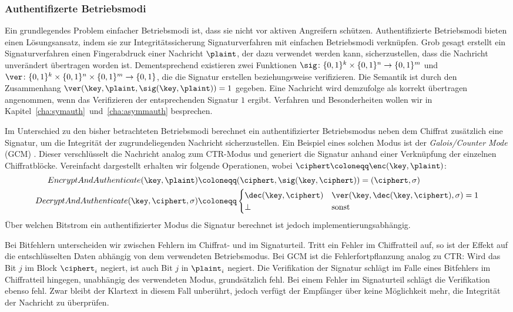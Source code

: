 \subsubsection{Authentifizerte Betriebsmodi}
Ein grundlegendes Problem einfacher Betriebsmodi ist, dass sie nicht vor aktiven Angreifern schützen. Authentifizierte Betriebsmodi bieten einen Lösungsansatz, indem sie zur Integritätssicherung Signaturverfahren mit einfachen Betriebsmodi verknüpfen. Grob gesagt erstellt ein Signaturverfahren einen Fingerabdruck einer Nachricht $\plaint$, der dazu verwendet werden kann, sicherzustellen, dass die Nachricht unverändert übertragen worden ist. Dementsprechend existieren zwei Funktionen $\sig \colon \{0,1\}^k \times \{0,1\}^n \rightarrow \{0,1\}^m$ und $\ver \colon \{0,1\}^k \times \{0,1\}^n \times \{0,1\}^m \rightarrow \{0,1\}$, die die Signatur erstellen beziehungsweise verifizieren. Die Semantik ist durch den Zusammenhang $\ver(\key,\plaint,\sig(\key, \plaint)) = 1$ gegeben. Eine Nachricht wird demzufolge als korrekt übertragen angenommen, wenn das Verifizieren der entsprechenden Signatur $1$ ergibt.
Verfahren und Besonderheiten wollen wir in Kapitel~\ref{cha:symauth}~und~\ref{cha:asymmauth} besprechen.

Im Unterschied zu den bisher betrachteten Betriebsmodi berechnet ein authentifizierter Betriebsmodus neben dem Chiffrat zusätzlich eine Signatur, um die Integrität der zugrundeliegenden Nachricht sicherzustellen. Ein Beispiel eines solchen Modus ist der \emph{Galois/Counter Mode} (GCM) \cite{NIST_GCM05}. Dieser verschlüsselt die Nachricht analog zum CTR-Modus und generiert die Signatur anhand einer Verknüpfung der einzelnen Chiffratblöcke. Vereinfacht dargestellt erhalten wir folgende Operationen, wobei $\ciphert \coloneqq \enc(\key, \plaint)$:
\begin{align*}
	EncryptAndAuthenticate(\key, \plaint) &\coloneqq (\ciphert, \sig(\key, \ciphert)) = (\ciphert, \sigma)\\
	DecryptAndAuthenticate(\key, \ciphert, \sigma) &\coloneqq \begin{cases}
		\dec(\key, \ciphert) & \ver(\key, \dec(\key, \ciphert), \sigma) = 1 \\
		\bot & \textnormal{sonst}
	\end{cases}
\end{align*}
Über welchen Bitstrom ein authentifizierter Modus die Signatur berechnet ist jedoch implementierungsabhängig.

Bei Bitfehlern unterscheiden wir zwischen Fehlern im Chiffrat- und im Signaturteil. Tritt ein Fehler im Chiffratteil auf, so ist der Effekt auf die entschlüsselten Daten abhängig von dem verwendeten Betriebsmodus. Bei GCM ist die Fehlerfortpflanzung analog zu CTR: Wird das Bit $j$ im Block $\ciphert_i$ negiert, ist auch Bit $j$ in $\plaint_i$ negiert. Die Verifikation der Signatur schlägt im Falle eines Bitfehlers im Chiffratteil hingegen, unabhängig des verwendeten Modus, grundsätzlich fehl. Bei einem Fehler im Signaturteil schlägt die Verifikation ebenso fehl. Zwar bleibt der Klartext in diesem Fall unberührt, jedoch verfügt der Empfänger über keine Möglichkeit mehr, die Integrität der Nachricht zu überprüfen.

